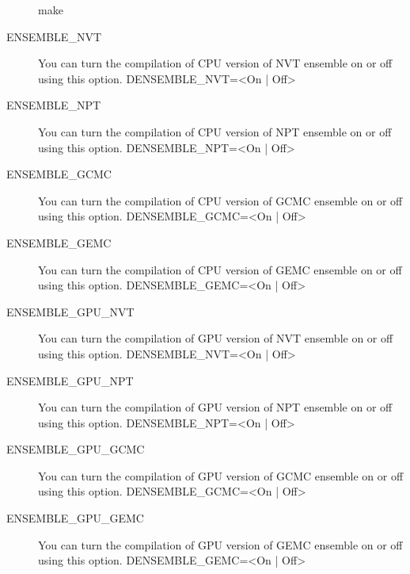\documentclass[letterpaper,10pt,english]{sphinxmanual}
\begin{document}
\begin{description}
\begin{sphinxVerbatim}[commandchars=\\\{\}]
\PYGZdl{} make
\end{sphinxVerbatim}

\item[{ENSEMBLE\_NVT}] \leavevmode
You can turn the compilation of CPU version of NVT ensemble on or off using this option.
\sphinxhyphen{}DENSEMBLE\_NVT=\textless{}On | Off\textgreater{}

\item[{ENSEMBLE\_NPT}] \leavevmode
You can turn the compilation of CPU version of NPT ensemble on or off using this option.
\sphinxhyphen{}DENSEMBLE\_NPT=\textless{}On | Off\textgreater{}

\item[{ENSEMBLE\_GCMC}] \leavevmode
You can turn the compilation of CPU version of GCMC ensemble on or off using this option.
\sphinxhyphen{}DENSEMBLE\_GCMC=\textless{}On | Off\textgreater{}

\item[{ENSEMBLE\_GEMC}] \leavevmode
You can turn the compilation of CPU version of GEMC ensemble on or off using this option.
\sphinxhyphen{}DENSEMBLE\_GEMC=\textless{}On | Off\textgreater{}

\item[{ENSEMBLE\_GPU\_NVT}] \leavevmode
You can turn the compilation of GPU version of NVT ensemble on or off using this option.
\sphinxhyphen{}DENSEMBLE\_NVT=\textless{}On | Off\textgreater{}

\item[{ENSEMBLE\_GPU\_NPT}] \leavevmode
You can turn the compilation of GPU version of NPT ensemble on or off using this option.
\sphinxhyphen{}DENSEMBLE\_NPT=\textless{}On | Off\textgreater{}

\item[{ENSEMBLE\_GPU\_GCMC}] \leavevmode
You can turn the compilation of GPU version of GCMC ensemble on or off using this option.
\sphinxhyphen{}DENSEMBLE\_GCMC=\textless{}On | Off\textgreater{}

\item[{ENSEMBLE\_GPU\_GEMC}] \leavevmode
You can turn the compilation of GPU version of GEMC ensemble on or off using this option.
\sphinxhyphen{}DENSEMBLE\_GEMC=\textless{}On | Off\textgreater{}

\end{description}
\end{document}
